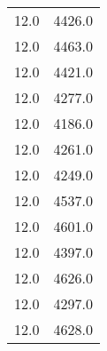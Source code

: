 \begin{table}
\begin{tabular}{S[]}
12.0 & 4426.0\\
12.0 & 4463.0\\
12.0 & 4421.0\\
12.0 & 4277.0\\
12.0 & 4186.0\\
12.0 & 4261.0\\
12.0 & 4249.0\\
12.0 & 4537.0\\
12.0 & 4601.0\\
12.0 & 4397.0\\
12.0 & 4626.0\\
12.0 & 4297.0\\
12.0 & 4628.0\\
\bottomrule
\end{tabular}\end{table}